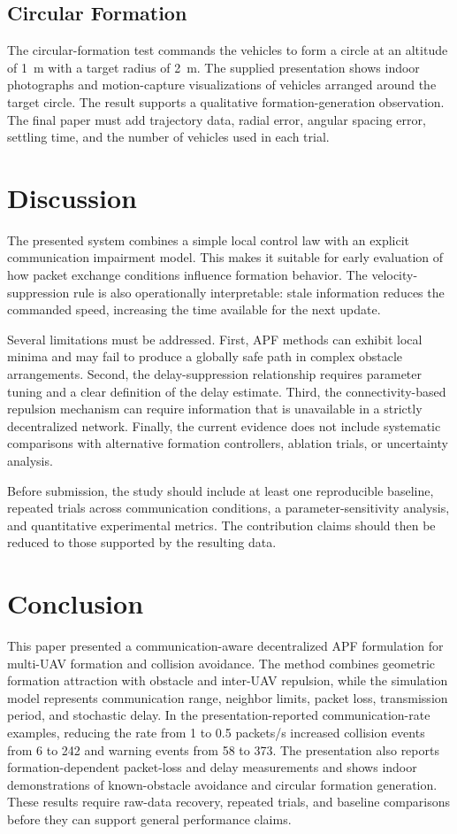 \documentclass[journal]{IEEEtran}
\begin{document}
\subsection{Circular Formation}
The circular-formation test commands the vehicles to form a circle at an altitude of \SI{1}{m} with a target radius of \SI{2}{m}. The supplied presentation shows indoor photographs and motion-capture visualizations of vehicles arranged around the target circle. The result supports a qualitative formation-generation observation. The final paper must add trajectory data, radial error, angular spacing error, settling time, and the number of vehicles used in each trial.

\section{Discussion}
\label{sec:discussion}
The presented system combines a simple local control law with an explicit communication impairment model. This makes it suitable for early evaluation of how packet exchange conditions influence formation behavior. The velocity-suppression rule is also operationally interpretable: stale information reduces the commanded speed, increasing the time available for the next update.

Several limitations must be addressed. First, APF methods can exhibit local minima and may fail to produce a globally safe path in complex obstacle arrangements. Second, the delay-suppression relationship requires parameter tuning and a clear definition of the delay estimate. Third, the connectivity-based repulsion mechanism can require information that is unavailable in a strictly decentralized network. Finally, the current evidence does not include systematic comparisons with alternative formation controllers, ablation trials, or uncertainty analysis.

Before submission, the study should include at least one reproducible baseline, repeated trials across communication conditions, a parameter-sensitivity analysis, and quantitative experimental metrics. The contribution claims should then be reduced to those supported by the resulting data.

\section{Conclusion}
\label{sec:conclusion}
This paper presented a communication-aware decentralized APF formulation for multi-UAV formation and collision avoidance. The method combines geometric formation attraction with obstacle and inter-UAV repulsion, while the simulation model represents communication range, neighbor limits, packet loss, transmission period, and stochastic delay. In the presentation-reported communication-rate examples, reducing the rate from 1 to 0.5 packets/s increased collision events from 6 to 242 and warning events from 58 to 373. The presentation also reports formation-dependent packet-loss and delay measurements and shows indoor demonstrations of known-obstacle avoidance and circular formation generation. These results require raw-data recovery, repeated trials, and baseline comparisons before they can support general performance claims.
\end{document}
